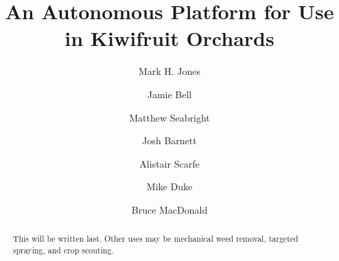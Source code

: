 \documentclass[preprint,authoryear,12pt]{elsarticle}
\begin{document}
\begin{frontmatter}



\title{An Autonomous Platform for Use in Kiwifruit Orchards}



\author[UoW]{Mark H. Jones} 

\author[UoA]{Jamie Bell}
\author[UoW]{Matthew Seabright}
\author[UoW]{Josh Barnett}
\author[RPL]{Alistair Scarfe}
\author[UoW]{Mike Duke}
\author[UoA]{Bruce MacDonald}

\address[UoW]{School of Engineering, University of Waikato, Hamilton, New Zealand}
\address[UoA]{Faculty of Engineering, University of Auckland, Auckland, New Zealand}
\address[RPL]{Robotics Plus Ltd, Newnham Innovation Park, Tauranga, New Zealand}

\begin{abstract}

    This will be written last.
    Other uses may be mechanical weed removal, targeted spraying, and crop scouting.
\end{abstract}

\begin{keyword}


\end{keyword}

\end{frontmatter}
\end{document}
